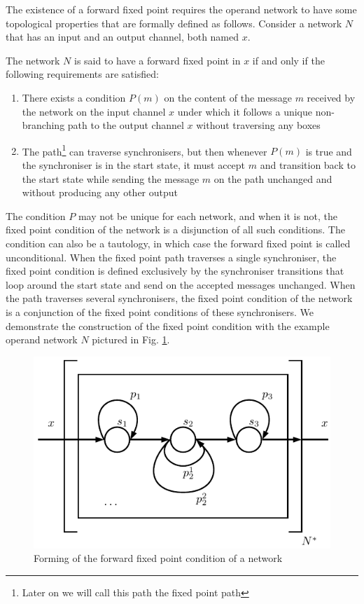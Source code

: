The existence of a forward fixed point requires the operand network to have some topological properties that are formally defined as follows. Consider a network $N$ that has an input and an output channel, both named $x$.

\begin{definition}\label{ffp_def}The network $N$ is said to have a forward fixed point in $x$ if and only if the following requirements are satisfied:
\begin{enumerate}
\item There exists a condition $P(m)$ on the content of the message $m$ received by the network on the input channel $x$ under which it follows a unique non-branching path to the output channel $x$ without traversing any boxes
\item The path\footnote{Later on we will call this path the fixed point path} can traverse synchronisers, but then whenever $P(m)$ is true and the synchroniser is in the start state, it must accept $m$ and transition back to the start state while sending the message $m$ on the path unchanged and without producing any other output%
\end{enumerate}
\end{definition}

The condition $P$ may not be unique for each network, and when it is not, the fixed point condition of the network is a disjunction of all such conditions. The condition can also be a tautology, in which case the forward fixed point is called unconditional. When the fixed point path traverses a single synchroniser, the fixed point condition is defined exclusively by the synchroniser transitions that loop around the start state and send on the accepted messages unchanged. When the path traverses several synchronisers, the fixed point condition of the network is a conjunction of the fixed point conditions of these synchronisers. We demonstrate the construction of the fixed point condition with the example operand network $N$ pictured in Fig. \ref{fig:ffp}.

\begin{figure}[h!]
\centering
\includegraphics[scale=0.8]{figs/chapter_04_ffp.pdf}
\caption{Forming of the forward fixed point condition of a network}
\label{fig:ffp}
\end{figure}

